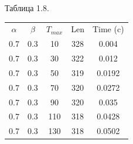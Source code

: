 \documentclass[12pt]{report}
\begin{document}
\begin{minipage}{0.5\textwidth}
\begin{center}
			Таблица 1.8.
		
			\begin{tabular}{|c c c c c|}
				\hline
				$\alpha$ & $\beta$ & $T_{max}$ & Len & Time (c) \\ [0.5ex]
				0.7 & 0.3 & 10 & 328 & 0.004 \\ 
				\hline 
				0.7 & 0.3 & 30 & 322 & 0.012 \\ 
				\hline 
				0.7 & 0.3 & 50 & 319 & 0.0192 \\ 
				\hline 
				0.7 & 0.3 & 70 & 320 & 0.0272 \\ 
				\hline 
				0.7 & 0.3 & 90 & 320 & 0.035 \\ 
				\hline 
				0.7 & 0.3 & 110 & 318 & 0.0428 \\ 
				\hline 
				0.7 & 0.3 & 130 & 318 & 0.0502 \\ 
				\hline 
			\end{tabular}
		
			
		
		\end{center}
	\end{minipage}

	\newpage
\end{document}
